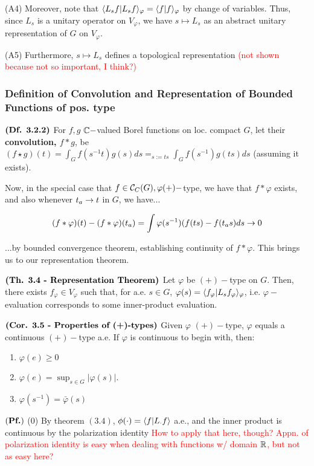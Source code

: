 \documentclass{article}
\begin{document}
(A4) Moreover, note that $\langle L_sf | L_sf \rangle_{\varphi} = \langle f | f \rangle_{\varphi}$ by change of variables. Thus, since $L_s$ is a unitary operator on $V_{\varphi}$, we have $s \mapsto L_s$ as an abstract unitary representation of $G$ on $V_{\varphi}$. 

(A5) Furthermore, $s \mapsto L_s$ defines a topological representation \textcolor{red}{(not shown because not so important, I think?)}

\subsubsection{Definition of Convolution and Representation of Bounded Functions of pos. type}

$\textbf{(Df. 3.2.2)}$ For $f,g$ $\mathbb{C}-$valued Borel functions on loc. compact $G$, let their \textbf{convolution, $f * g$}, be $(f \star g)(t) = \int_G f(s^{-1}t)g(s) ds =_{s := ts} \int_G f(s^{-1})g(ts)ds$ (assuming it exists).

Now, in the special case that $f \in \mathcal{C}_C(G), \varphi (+)-$type, we have that $f * \varphi$ exists, and also whenever $t_a \rightarrow t$ in $G$, we have...

$$(f*\varphi)(t) - (f*\varphi)(t_a) = \int \varphi(s^{-1})(f(ts) - f(t_as)  ds \rightarrow 0$$

...by bounded convergence theorem, establishing continuity of $f * \varphi$. This brings us to our representation theorem.

$\textbf{(Th. 3.4 - Representation Theorem)}$ Let $\varphi$ be $(+)-$type on $G$. Then, there exists $f_{\varphi} \in V_{\varphi}$ such that, for a.e. $s \in G$, $\varphi(s) = \langle f_{\varphi} | L_sf_{\varphi} \rangle_{\varphi}$, i.e. $\varphi-$evaluation corresponds to some inner-product evaluation.

$\textbf{(Cor. 3.5 - Properties of (+)-types)}$ Given $\varphi$ $ (+)-$type, $\varphi$ equals a continuous $(+)-$type a.e. If $\varphi$ is continuous to begin with, then:

\begin{enumerate}
    \item $\varphi(e) \geq 0$
    \item $\varphi(e) = \sup_{s \in G} |\varphi(s)|$.
    \item $\varphi(s^{-1}) = \bar{\varphi}(s)$
\end{enumerate}

$(\textbf{Pf.})$ (0) By theorem $(3.4)$, $\phi(\cdot) = \langle f | L_{\cdot}f \rangle$ a.e., and the inner product is continuous by the polarization identity \textcolor{red}{How to apply that here, though? Appn. of polarization identity is easy when dealing with functions w/ domain $\mathbb{R}$, but not as easy here?}
\end{document}
